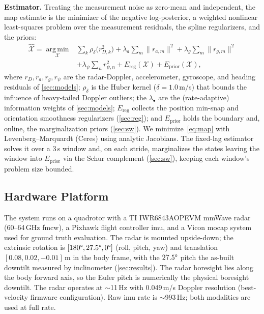\textbf{Estimator.}
Treating the measurement noise as zero-mean and independent, the
\ac{map} estimate is the minimizer of the negative
log-posterior, a weighted nonlinear least-squares problem over the
measurement residuals, the spline regularizers, and the priors:
\begin{equation}
\begin{aligned}
  \hat{\mathcal{X}} = \operatorname*{arg\,min}_{\mathcal{X}}
    & \sum_{k}\rho_\delta\!\bigl(r_{D,k}^2\bigr)
    + \lambda_a\!\sum_{m}\lVert r_{a,m}\rVert^2
    + \lambda_g\!\sum_{m}\lVert r_{g,m}\rVert^2 \\
    & + \lambda_\psi\!\sum_{n} r_{\psi,n}^2
    + E_{\text{reg}}(\mathcal{X})
    + E_{\text{prior}}(\mathcal{X}),
\end{aligned}
\label{eq:map}
\end{equation}
where $r_D,r_a,r_g,r_\psi$ are the radar-Doppler, accelerometer,
gyroscope, and heading residuals of \autoref{sec:models};
$\rho_\delta$ is the Huber kernel ($\delta{=}1.0$\,m/s) that bounds the
influence of heavy-tailed Doppler outliers; the $\lambda_\bullet$ are the
(rate-adaptive) information weights of \autoref{sec:models};
$E_{\text{reg}}$ collects the position min-snap and orientation
smoothness regularizers (\autoref{sec:reg}); and $E_{\text{prior}}$
holds the boundary and, online, the marginalization priors
(\autoref{sec:sw}).  We minimize~\eqref{eq:map} with
Levenberg--Marquardt (Ceres) using analytic Jacobians.  The fixed-lag
estimator solves it over a 3\,s window and, on each stride, marginalizes
the states leaving the window into $E_{\text{prior}}$ via the Schur
complement (\autoref{sec:sw}), keeping each window's problem size bounded.

\subsection{Hardware Platform}
The system runs on a quadrotor with a TI IWR6843AOPEVM
mmWave radar (60--64\,GHz \ac{fmcw}), a Pixhawk flight
controller \ac{imu}, and a Vicon \ac{mocap} system used for ground
truth evaluation.  The radar is mounted upside-down; the extrinsic
rotation is $[180\degree, 27.5\degree, 0\degree]$
(roll, pitch, yaw) and translation $[0.08, 0.02, -0.01]$\,m in the body
frame, with the $27.5\degree$ pitch the as-built downtilt measured by
inclinometer (\autoref{sec:results}).  The radar boresight lies along the body forward axis, so the
Euler pitch is numerically the physical boresight downtilt.  The radar operates at $\sim$11\,Hz with 0.049\,m/s Doppler
resolution (best-velocity firmware configuration).  Raw \ac{imu} rate
is $\sim$993\,Hz; both modalities are used at full rate.

